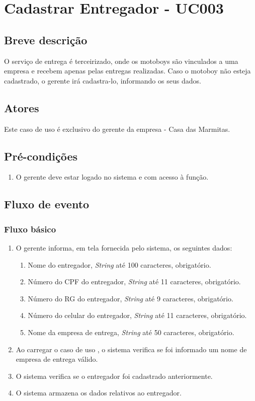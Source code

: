 \chapter{Cadastrar Entregador - UC003} \label{uc003}

\section{Breve descrição}

O serviço de entrega é terceirizado, onde os motoboys são vinculados a uma empresa e recebem apenas pelas entregas realizadas. Caso o motoboy não esteja cadastrado, o gerente irá cadastra-lo, informando os seus dados.

\section{Atores}

Este caso de uso é exclusivo do gerente da empresa - Casa das Marmitas.

\section{Pré-condições}

\begin{enumerate}
	\item O gerente deve estar logado no sistema e com acesso à função.
\end{enumerate}

\section{Fluxo de evento}

\subsection{Fluxo básico}

\begin{enumerate}
	\item O gerente informa, em tela fornecida pelo sistema, os seguintes dados:
	\begin{enumerate}
		\item Nome do entregador, \emph{String} até 100 caracteres, obrigatório.
		\item Número do CPF do entregador, \emph{String} até 11 caracteres, obrigatório.
		\item Número do RG do entregador, \emph{String} até 9 caracteres, obrigatório.
		\item Número do celular do entregador, \emph{String} até 11 caracteres, obrigatório.	
		\item Nome da empresa de entrega, \emph{String} até 50 caracteres, obrigatório.
	\end{enumerate}
	\item Ao carregar o caso de uso , o sistema verifica se foi informado um nome de empresa de entrega válido.
	\item O sistema verifica se o entregador foi cadastrado anteriormente.
	\item O sistema armazena os dados relativos ao entregador.
\end{enumerate}

